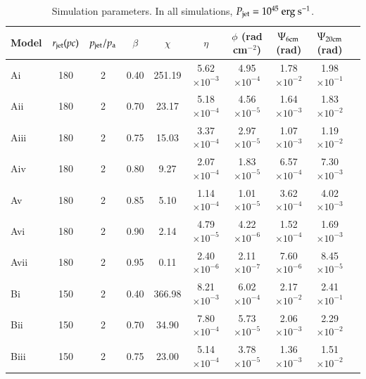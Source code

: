 \begin{table}
\caption{Simulation parameters. In all simulations, $P_{\rm{jet}}=10^{45} \rm \ erg \ s^{-1}$.}
\centering
\begin{tabular}{l * {9}{c}}
\hline \hline
Model  & $r_{\rm{jet}}(pc)$ & $p_{\rm{jet}}/p_{\rm{a}}$ & $\beta$ & $\chi$ & $\eta$ & $\phi$ (rad cm$^{-2}$) & $\Psi_{6\rm{cm}}$ (rad) & $\Psi_{20\rm{cm}}$ (rad) \\
\hline
	\hline
	 Ai    &  180 &   2  &  0.40  &     251.19 &   5.62$\times10^{-3}$  &    4.95$\times10^{-4}$         &     1.78$\times10^{-2}$		&  1.98$\times10^{-1}$      \\	 
  	 Aii 	& 180 &  	2  &  0.70 & 	23.17 &	 5.18$\times10^{-4}$ & 	4.56$\times10^{-5}$ 	&	1.64$\times10^{-3}$		&  1.83$\times10^{-2}$	  \\
	 Aiii 	& 180 &  	2  &  0.75 & 	15.03 &	 3.37$\times10^{-4}$ &	2.97$\times10^{-5}$ 	&	1.07$\times10^{-3}$		&  1.19$\times10^{-2}$	  \\
	Aiv 	& 180 & 	2  & 	0.80 & 	9.27   &  	2.07$\times10^{-4}$  &	1.83$\times10^{-5}$		&	6.57$\times10^{-4}$ 	&  7.30$\times10^{-3}$	 \\
	Av 	& 180 & 	2  & 	0.85 & 	 5.10  & 	1.14$\times10^{-4}$ &	 1.01$\times10^{-5}$	& 	3.62$\times10^{-4}$		&  4.02$\times10^{-3}$  	 \\
	 Avi 	& 180 & 	2  &	0.90 &  	2.14   & 	4.79$\times10^{-5}$  &	 4.22$\times10^{-6}$	&  	1.52$\times10^{-4}$		&  1.69$\times10^{-3}$ 	\\
	 Avii  &  180  &  2  & 0.95  &   0.11  &   2.40$\times10^{-6}$       &    2.11$\times10^{-7}$		&	7.60$\times10^{-6}$		&   8.45$\times10^{-5}$  \\
		\hline
        Bi    &  150  & 2  &  0.40  &   366.98  & 8.21$\times10^{-3}$  & 6.02$\times10^{-4}$ 	& 	2.17$\times10^{-2}$ 	& 	2.41$\times10^{-1}$  \\
  	 Bii 	& 150 &  2  &  0.70 &   34.90 & 7.80$\times10^{-4}$  &	5.73$\times10^{-5}$		&	2.06$\times10^{-3}$		&	2.29$\times10^{-2}$  \\
	 Biii 	& 150 &  2  &  0.75 &   23.00 & 5.14$\times10^{-4}$  &	3.78$\times10^{-5}$		&	1.36$\times10^{-3}$		&	1.51$\times10^{-2}$  \\

\end{tabular}
\end{table}

